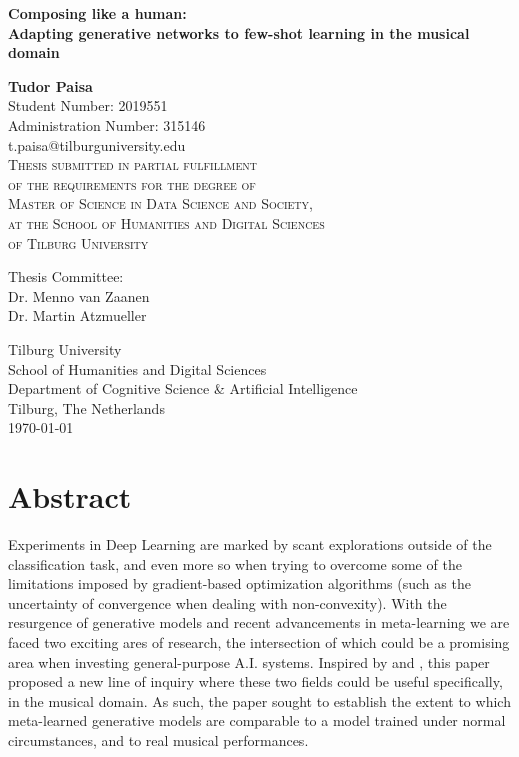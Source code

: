 \documentclass[a4paper]{book}
\begin{document}
\begin{titlepage}
    \begin{center}
        \huge\textbf{Composing like a human:} \\
        \Large\textbf{Adapting generative networks to few-shot learning in the musical domain}
        \normalsize

        \vspace{1cm}

        \textbf{Tudor Paisa}\\
        Student Number: 2019551 \\
        Administration Number: 315146\\
        t.paisa@tilburguniversity.edu\\

        \vspace{1cm}
        \textsc{Thesis submitted in partial fulfillment\\
        of the requirements for the degree of\\
        Master of Science in Data Science and Society,\\
        at the School of Humanities and Digital Sciences\\
        of Tilburg University\\}

        \vspace{2cm}
        Thesis Committee:\\
        Dr. Menno van Zaanen\\
        Dr. Martin Atzmueller\\
        \vfill

        Tilburg University\\
        School of Humanities and Digital Sciences\\
        Department of Cognitive Science \& Artificial Intelligence\\
        Tilburg, The Netherlands\\
        \today
 
    \end{center}
\end{titlepage}

\chapter*{Abstract}
Experiments in Deep Learning are marked by scant explorations outside of the classification task, and even more so when trying to overcome some of the limitations imposed by gradient-based optimization algorithms (such as the uncertainty of convergence when dealing with non-convexity). With the resurgence of generative models and recent advancements in meta-learning we are faced two exciting ares of research, the intersection of which could be a promising area when investing general-purpose A.I. systems. Inspired by \textcite{clouatre_figr_2019} and \textcite{zhang_metagan_2018}, this paper proposed a new line of inquiry where these two fields could be useful specifically, in the musical domain. As such, the paper sought to establish the extent to which meta-learned generative models are comparable to a model trained under normal circumstances, and to real musical performances.
\end{document}
